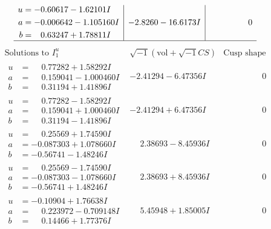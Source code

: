 \documentclass[1p]{elsarticle_modified}
\theoremstyle{definition}
\newcommand{\I}{\sqrt{-1}}
\begin{document}
$$\begin{array}{c|c|c}
\begin{aligned}
u &= -0.60617 - 1.62101 I \\
a &= -0.006642 - 1.105160 I \\
b &= \phantom{-}0.63247 + 1.78811 I\end{aligned}
 & -2.8260 - 16.6173 I & \phantom{-0.000000 } 0\\
 \hline 
 \end{array}$$\newpage$$\begin{array}{c|c|c}  
\text{Solutions to }I^u_{1}& \I (\text{vol} + \sqrt{-1}CS) & \text{Cusp shape}\\
 \hline 
\begin{aligned}
u &= \phantom{-}0.77282 + 1.58292 I \\
a &= \phantom{-}0.159041 - 1.000460 I \\
b &= \phantom{-}0.31194 + 1.41896 I\end{aligned}
 & -2.41294 - 6.47356 I & \phantom{-0.000000 } 0 \\ \hline\begin{aligned}
u &= \phantom{-}0.77282 - 1.58292 I \\
a &= \phantom{-}0.159041 + 1.000460 I \\
b &= \phantom{-}0.31194 - 1.41896 I\end{aligned}
 & -2.41294 + 6.47356 I & \phantom{-0.000000 } 0 \\ \hline\begin{aligned}
u &= \phantom{-}0.25569 + 1.74590 I \\
a &= -0.087303 + 1.078660 I \\
b &= -0.56741 - 1.48246 I\end{aligned}
 & \phantom{-}2.38693 - 8.45936 I & \phantom{-0.000000 } 0 \\ \hline\begin{aligned}
u &= \phantom{-}0.25569 - 1.74590 I \\
a &= -0.087303 - 1.078660 I \\
b &= -0.56741 + 1.48246 I\end{aligned}
 & \phantom{-}2.38693 + 8.45936 I & \phantom{-0.000000 } 0 \\ \hline\begin{aligned}
u &= -0.10904 + 1.76638 I \\
a &= \phantom{-}0.223972 - 0.709148 I \\
b &= \phantom{-}0.14466 + 1.77376 I\end{aligned}
 & \phantom{-}5.45948 + 1.85005 I & \phantom{-0.000000 } 0 \\ \hline\begin{aligned}

\end{aligned}
\end{array}$$
\end{document}
